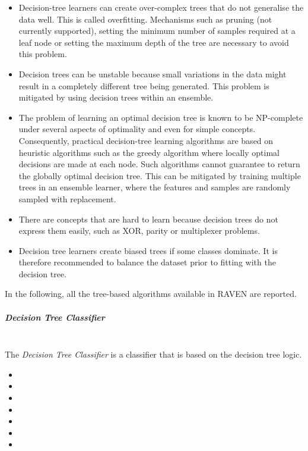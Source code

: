 \begin{itemize}
  \item Decision-tree learners can create over-complex trees that do not
  generalise the data well.
  This is called overfitting.
  Mechanisms such as pruning (not currently supported), setting the minimum
  number of samples required at a leaf node or setting the maximum depth of the
  tree are necessary to avoid this problem.
  \item Decision trees can be unstable because small variations in the data
  might result in a completely different tree being generated.
  This problem is mitigated by using decision trees within an ensemble.
  \item The problem of learning an optimal decision tree is known to be
  NP-complete under several aspects of optimality and even for simple concepts.
  Consequently, practical decision-tree learning algorithms are based on
  heuristic algorithms such as the greedy algorithm where locally optimal
  decisions are made at each node.
  Such algorithms cannot guarantee to return the globally optimal decision tree.
  This can be mitigated by training multiple trees in an ensemble learner, where
  the features and samples are randomly sampled with replacement.
  \item There are concepts that are hard to learn because decision trees do not
  express them easily, such as XOR, parity or multiplexer problems.
  \item Decision tree learners create biased trees if some classes dominate.
  It is therefore recommended to balance the dataset prior to fitting with the
  decision tree.
\end{itemize}


In the following, all the tree-based algorithms available in RAVEN are reported.

\subparagraph{Decision Tree Classifier}
\mbox{}
\\The \textit{Decision Tree Classifier} is a classifier that is based on the
decision tree logic.

\begin{itemize}
  \item {}
  \item {}
  \item {}
  \item {}
  \item {}
  \item {}
  \item {}
\end{itemize}


